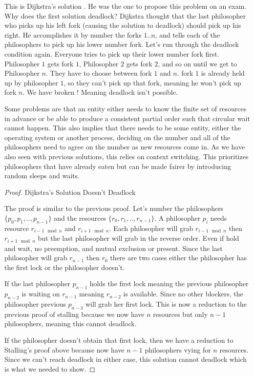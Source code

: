 This is Dijkstra's solution \cite[P. 20]{EWD:EWD310}. He was the one to propose this problem on an exam.
Why does the first solution deadlock? Dijkstra thought that the last philosopher who picks up his left fork (causing the solution to deadlock) should pick up his right.
He accomplishes it by number the forks $1..n$, and tells each of the philosophers to pick up his lower number fork.
Let's run through the deadlock condition again.
Everyone tries to pick up their lower number fork first.
Philosopher $1$ gets fork $1$, Philosopher $2$ gets fork $2$, and so on until we get to Philosopher $n$.
They have to choose between fork $1$ and $n$.
fork $1$ is already held up by philosopher $1$, so they can't pick up that fork, meaning he won't pick up fork $n$.
We have broken ! Meaning deadlock isn't possible.

Some problems are that an entity either needs to know the finite set of resources in advance or be able to produce a consistent partial order such that circular wait cannot happen.
This also implies that there needs to be some entity, either the operating system or another process, deciding on the number and all of the philosophers need to agree on the number as new resources come in.
As we have also seen with previous solutions, this relies on context switching.
This prioritizes philosophers that have already eaten but can be made fairer by introducing random sleeps and waits.

\begin{proof} Dijkstra's Solution Doesn't Deadlock
	
	The proof is similar to the previous proof.
	Let's number the philosophers $\{p_0, p_1, .., p_{n-1}\}$ and the resources $\{r_0, r_1, .., r_{n-1}\}$.
	A philosopher $p_i$ needs resource $r_{i-1 \mod n}$ and $r_{i + 1 \mod n}$.
	Each philosopher will grab $r_{i-1 \mod n}$ then $r_{i + 1 \mod n}$ but the last philosopher will grab in the reverse order.
	Even if hold and wait, no preemption, and mutual exclusion or present.
	Since the last philosopher will grab $r_{n-1}$ then $r_0$ there are two cases either the philosopher has the first lock or the philosopher doesn't.
	
	If the last philosopher $p_{n-1}$ holds the first lock meaning the previous philosopher $p_{n-2}$ is waiting on $r_{n-1}$ meaning $r_{n-2}$ is available.
	Since no other blockers, the philosopher previous $p_{n-3}$ will grab her first lock.
	This is now a reduction to the previous proof of stalling because we now have $n$ resources but only $n-1$ philosophers, meaning this cannot deadlock.
	
	If the philosopher doesn't obtain that first lock, then we have a reduction to Stalling's proof above because now have $n-1$ philosophers vying for $n$ resources.
	Since we can't reach deadlock in either case, this solution cannot deadlock which is what we needed to show.
	
\end{proof}

